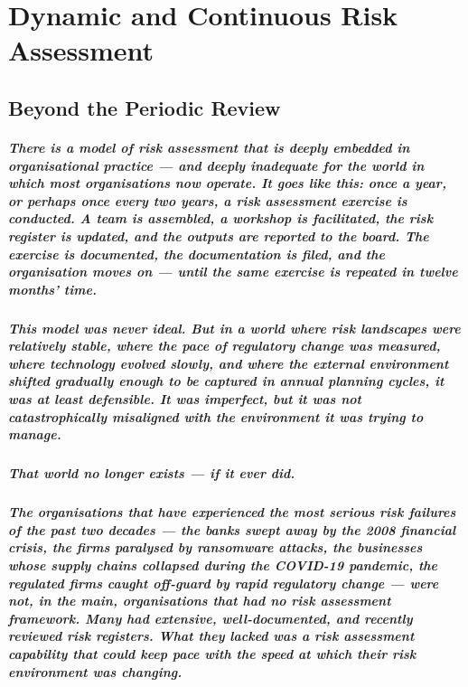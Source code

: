 \chapter{Dynamic and Continuous Risk Assessment}
\label{chap:Dynamic and Continuous Risk Assessment}

\section{Beyond the Periodic Review}
\paragraph{There is a model of risk assessment that is deeply embedded in organisational practice — and deeply inadequate for the world in which most organisations now operate. It goes like this: once a year, or perhaps once every two years, a risk assessment exercise is conducted. A team is assembled, a workshop is facilitated, the risk register is updated, and the outputs are reported to the board. The exercise is documented, the documentation is filed, and the organisation moves on — until the same exercise is repeated in twelve months' time.}
\paragraph{This model was never ideal. But in a world where risk landscapes were relatively stable, where the pace of regulatory change was measured, where technology evolved slowly, and where the external environment shifted gradually enough to be captured in annual planning cycles, it was at least defensible. It was imperfect, but it was not catastrophically misaligned with the environment it was trying to manage.}
\paragraph{That world no longer exists — if it ever did.}
\paragraph{The organisations that have experienced the most serious risk failures of the past two decades — the banks swept away by the 2008 financial crisis, the firms paralysed by ransomware attacks, the businesses whose supply chains collapsed during the COVID-19 pandemic, the regulated firms caught off-guard by rapid regulatory change — were not, in the main, organisations that had no risk assessment framework. Many had extensive, well-documented, and recently reviewed risk registers. What they lacked was a risk assessment capability that could keep pace with the speed at which their risk environment was changing.}
